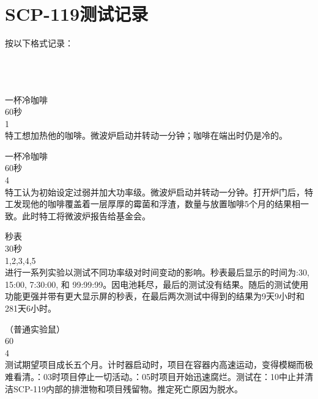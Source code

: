 \section{SCP-119测试记录}

\label{sec:DOC-test-log-for-scp-119}

\begin{scpbox}

按以下格式记录：\\
\\
\\
\\

\end{scpbox}

\begin{scpbox}


一杯冷咖啡\\
60秒\\
1\\
特工想加热他的咖啡。微波炉启动并转动一分钟；咖啡在端出时仍是冷的。

一杯冷咖啡\\
60秒\\
4\\
特工认为初始设定过弱并加大功率级。微波炉启动并转动一分钟。打开炉门后，特工发现他的咖啡覆盖着一层厚厚的霉菌和浮渣，数量与放置咖啡5个月的结果相一致。此时特工将微波炉报告给基金会。

秒表\\
30秒\\
1,2,3,4,5\\
进行一系列实验以测试不同功率级对时间变动的影响。秒表最后显示的时间为:30, 15:00, 7:30:00, 和 99:99:99。因电池耗尽，最后的测试没有结果。随后的测试使用功能更强并带有更大显示屏的秒表，在最后两次测试中得到的结果为9天9小时和281天6小时。

（普通实验鼠）\\
60\\
4\\
测试期望项目成长五个月。计时器启动时，项目在容器内高速运动，变得模糊而极难看清。：03时项目停止一切活动。：05时项目开始迅速腐烂。测试在：10中止并清洁SCP-119内部的排泄物和项目残留物。推定死亡原因为脱水。


\end{scpbox}
